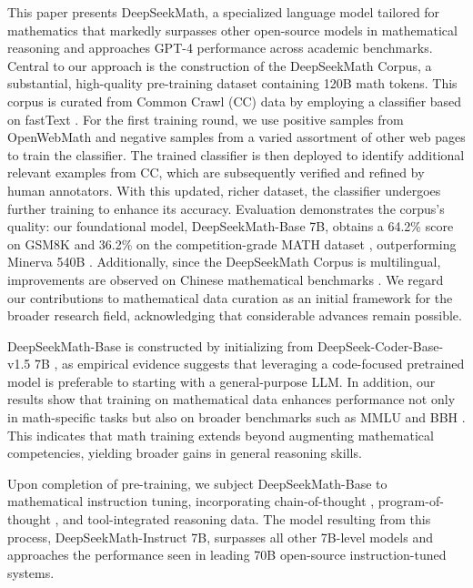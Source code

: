 This paper presents DeepSeekMath, a specialized language model tailored for mathematics that markedly surpasses other open-source models in mathematical reasoning and approaches GPT-4 performance across academic benchmarks. Central to our approach is the construction of the DeepSeekMath Corpus, a substantial, high-quality pre-training dataset containing 120B math tokens. This corpus is curated from Common Crawl (CC) data by employing a classifier based on fastText \citep{joulin2016fasttext}. For the first training round, we use positive samples from OpenWebMath \citep{openwebmath} and negative samples from a varied assortment of other web pages to train the classifier. The trained classifier is then deployed to identify additional relevant examples from CC, which are subsequently verified and refined by human annotators. With this updated, richer dataset, the classifier undergoes further training to enhance its accuracy. Evaluation demonstrates the corpus’s quality: our foundational model, DeepSeekMath-Base 7B, obtains a 64.2\% score on GSM8K \citep{gsm8k} and 36.2\% on the competition-grade MATH dataset \citep{MATH}, outperforming Minerva 540B \citep{minerva}. Additionally, since the DeepSeekMath Corpus is multilingual, improvements are observed on Chinese mathematical benchmarks \citep{wei2023cmath,agieval}. We regard our contributions to mathematical data curation as an initial framework for the broader research field, acknowledging that considerable advances remain possible.

DeepSeekMath-Base is constructed by initializing from DeepSeek-Coder-Base-v1.5 7B \citep{deepseek-coder}, as empirical evidence suggests that leveraging a code-focused pretrained model is preferable to starting with a general-purpose LLM. In addition, our results show that training on mathematical data enhances performance not only in math-specific tasks but also on broader benchmarks such as MMLU \citep{mmlu} and BBH \citep{bbh}. This indicates that math training extends beyond augmenting mathematical competencies, yielding broader gains in general reasoning skills.

Upon completion of pre-training, we subject DeepSeekMath-Base to mathematical instruction tuning, incorporating chain-of-thought \citep{cot}, program-of-thought \citep{pot,pal}, and tool-integrated reasoning \citep{tora} data. The model resulting from this process, DeepSeekMath-Instruct 7B, surpasses all other 7B-level models and approaches the performance seen in leading 70B open-source instruction-tuned systems.

